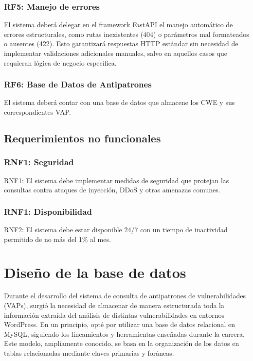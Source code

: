 \subsubsection{RF5: Manejo de errores}

El sistema deberá delegar en el framework FastAPI el manejo automático de errores estructurales, como rutas inexistentes (404) o parámetros mal formateados o ausentes (422). Esto garantizará respuestas HTTP estándar sin necesidad de implementar validaciones adicionales manuales, salvo en aquellos casos que requieran lógica de negocio específica.

\subsubsection{RF6: Base de Datos de Antipatrones}

El sistema deberá contar con una base de datos que almacene los CWE y sus correspondientes VAP.

\subsection{Requerimientos no funcionales}

\subsubsection{RNF1: Seguridad}

RNF1: El sistema debe implementar medidas de seguridad que protejan las consultas contra ataques de inyección, DDoS y otras amenazas comunes.

\subsubsection{RNF1: Disponibilidad}

RNF2: El sistema debe estar disponible 24/7 con un tiempo de inactividad permitido de no más del 1\% al mes.


\section{Diseño de la base de datos}

Durante el desarrollo del sistema de consulta de antipatrones de vulnerabilidades (VAPs), surgió la necesidad de almacenar de manera estructurada toda la información extraída del análisis de distintas vulnerabilidades en entornos WordPress. En un principio, opté por utilizar una base de datos relacional en MySQL, siguiendo los lineamientos y herramientas enseñadas durante la carrera. Este modelo, ampliamente conocido, se basa en la organización de los datos en tablas relacionadas mediante claves primarias y foráneas.


